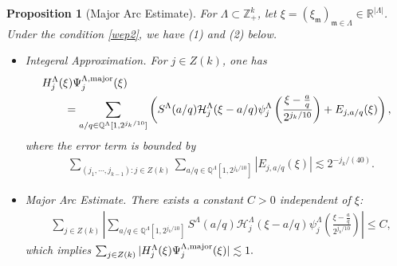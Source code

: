 \documentclass[11 pt,letterpaper]{amsart}
\theoremstyle{plain}
\newtheorem{proposition}{Proposition}\numberwithin{proposition}{section}
\theoremstyle{definition}
\theoremstyle{remark} \theoremstyle{exam} \theoremstyle{ob}
\numberwithin{equation}{section}
\begin{document}
\begin{proposition}[Major Arc Estimate] \label{lemm29}
For $\Lambda\subset \mathbb{Z}_+^k $, let $\xi=(\xi_{\mathfrak{m}})_{\mathfrak{m}\in \Lambda}\in \mathbb{R}^{|\Lambda|}$. Under the condition \eqref{wep2},   we have (1) and (2) below. 
\begin{itemize}
\item[(1)]  Integeral Approximation.  For $j\in Z(k)$,
one has
\begin{align}\label{b40}
&H^{\Lambda}_j(\xi) \Psi^{\Lambda,\rm{major}}_{j}(\xi)\nonumber\\
&\qquad=  \sum_{a/q\in \mathbb{Q}^{\Lambda}[1, 2^{j_k/10}]} \left(S^{\Lambda}(a/q) \mathcal{H}^{\Lambda}_j(\xi-a/q)  \psi_j^{\Lambda}\left( \frac{\xi-\frac{a}{q}}{2^{j_{k}/10}} \right)+E_{j,a/q}(\xi)\right), 
\end{align}
where the error term is bounded by
\begin{align*}
&\sum_{(j_1,\cdots,j_{k-1}):j\in Z(k)}\sum_{a/q\in \mathbb{Q}^{\Lambda}[1, 2^{j_k/10}]}|E_{j,a/q}(\xi)|\lesssim 2^{-j_k/(40)}.
\end{align*}
\item[(2)]  Major Arc Estimate.
There exists a constant $C >0$ independent of $\xi$:
\begin{align}\label{23mm}
&\sum_{j\in Z(k) }\left|   \sum_{a/q\in \mathbb{Q}^{\Lambda}[1,2^{j_k/10}]}S^{\Lambda}(a/q)\mathcal{H}_j^{\Lambda}(\xi-a/q) \psi_j^{\Lambda}\left( \frac{\xi-\frac{a}{q}}{2^{j_{k}/10}} \right) \right|
  \le C,
\end{align}
  which  implies 
$
  \sum_{j\in Z(k)} |H^{\Lambda}_j(\xi) \Psi^{\Lambda,\rm{major}}_{j}(\xi)|\lesssim 1.
$
\end{itemize}

\end{proposition} 
\end{document}

